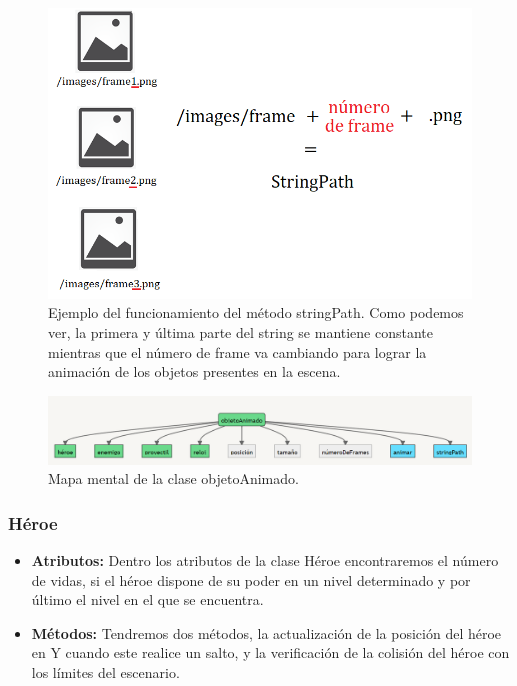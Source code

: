 \documentclass{article}
\begin{document}
\newpage
\begin{figure}[h]
\includegraphics[scale=0.6]{Images/string.png}
\centering
\caption{Ejemplo del funcionamiento del método stringPath. Como podemos ver, la primera y última parte del string se mantiene constante mientras que el número de frame va cambiando para lograr la animación de los objetos presentes en la escena.}
\label{fig:string}
\end{figure}

\begin{figure}[h]
\includegraphics[scale=0.5]{Images/ObjetoAnimado.png}
\centering
\caption{Mapa mental de la clase objetoAnimado.}
\label{fig:mmobjani}
\end{figure}

    \subsubsection{Héroe}
    \begin{itemize}
        \item \textbf{Atributos:} Dentro los atributos de la clase Héroe encontraremos el número de vidas, si el héroe dispone de su poder en un nivel determinado y por último el nivel en el que se encuentra.
        \item \textbf{Métodos:} Tendremos dos métodos, la actualización de la posición del héroe en Y cuando este realice un salto, y la verificación de la colisión del héroe con los límites del escenario.
    \end{itemize}
    
\end{document}

